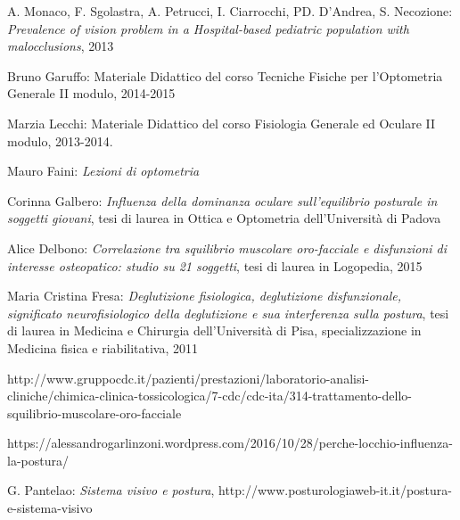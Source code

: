 \begin{thebibliography}{9}
A. Monaco, F. Sgolastra, A. Petrucci, I. Ciarrocchi, PD. D’Andrea, S. Necozione: \emph{Prevalence of vision problem in a Hospital-based pediatric population with malocclusions}, 2013

Bruno Garuffo: Materiale Didattico del corso Tecniche Fisiche per l’Optometria Generale II modulo, 2014-2015

Marzia Lecchi: Materiale Didattico del corso Fisiologia Generale ed Oculare II modulo, 2013-2014.

Mauro Faini: \emph{Lezioni di optometria}

Corinna Galbero: \emph{Influenza della dominanza oculare sull’equilibrio posturale in soggetti giovani}, tesi di laurea in Ottica e Optometria dell’Università di Padova 

Alice Delbono: \emph{Correlazione tra squilibrio muscolare oro-facciale e disfunzioni di interesse osteopatico: studio su 21 soggetti}, tesi di laurea in Logopedia, 2015

Maria Cristina Fresa: \emph{Deglutizione fisiologica, deglutizione disfunzionale, significato neurofisiologico della deglutizione e sua interferenza sulla postura}, tesi di laurea in Medicina e Chirurgia dell’Università di Pisa, specializzazione in Medicina fisica e riabilitativa, 2011

http://www.gruppocdc.it/pazienti/prestazioni/laboratorio-analisi-cliniche/chimica-clinica-tossicologica/7-cdc/cdc-ita/314-trattamento-dello-squilibrio-muscolare-oro-facciale

https://alessandrogarlinzoni.wordpress.com/2016/10/28/perche-locchio-influenza-la-postura/

G. Pantelao: \emph{Sistema visivo e postura}, http://www.posturologiaweb-it.it/postura-e-sistema-visivo

\end{thebibliography} 